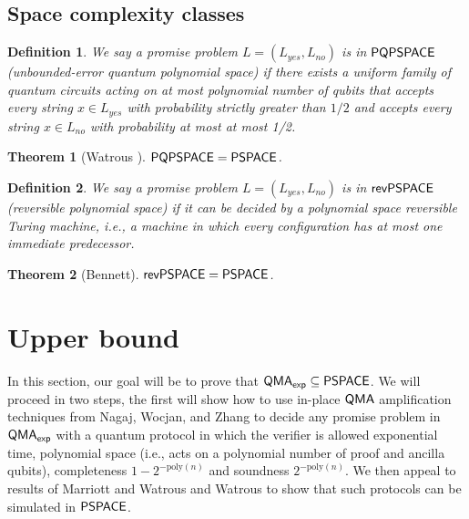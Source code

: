 \documentclass[11pt]{article}
\newtheorem{theorem}{Theorem}
\newtheorem{definition}{Definition}
\theoremstyle{definition}
\theoremstyle{remark}
\newcommand\QMA{{\sf{QMA}}}
\newcommand\PSPACE{{\sf{PSPACE}}}
\newcommand\QMAexp{{\sf{QMA}_{exp}}}
\newcommand\PQPSPACE{{\sf{PQPSPACE}}}
\newcommand\revPSPACE{{\sf{revPSPACE}}}
\newcommand{\poly}{\textrm{poly}}
\begin{document}
\subsection{Space complexity classes}
\begin{definition}We say a promise problem $L=(L_{yes},L_{no})$ is in $\PQPSPACE$ (unbounded-error quantum polynomial space) if there exists a uniform family of quantum circuits acting on at most polynomial number of qubits that accepts every string $x\in L_{yes}$ with probability strictly greater than $1/2$ and accepts every string $x \in L_{no}$ with probability at most at most 1/2.
	
\end{definition}
\begin{theorem}[Watrous \cite{Watrous99}]\label{thm:pqpspace} $\PQPSPACE=\PSPACE$.	
\end{theorem}

\begin{definition}We say a promise problem $L=(L_{yes},L_{no})$ is in $\revPSPACE$ (reversible polynomial space) if it can be decided by a polynomial space reversible Turing machine, i.e., a machine in which every configuration has at most one immediate predecessor.  	
\end{definition}

\begin{theorem}[Bennett\cite{bennett89}]\label{thm:revpspace}$\revPSPACE=\PSPACE$.
\end{theorem}

\section{Upper bound}
In this section, our goal will be to prove that $\QMAexp\subseteq\PSPACE$.  We will proceed in two steps, the first will show how to use in-place $\QMA$ amplification techniques from Nagaj, Wocjan, and Zhang \cite{nwz11} to decide any promise problem in $\QMAexp$ with a quantum protocol in which the verifier is allowed exponential time, polynomial space (i.e., acts on a polynomial number of proof and ancilla qubits), completeness $1-2^{-\poly(n)}$ and soundness $2^{-\poly(n)}$.  We then appeal to results of Marriott and Watrous \cite{mw05} and  Watrous \cite{Watrous99} to show that such protocols can be simulated in $\PSPACE$.
\end{document}
